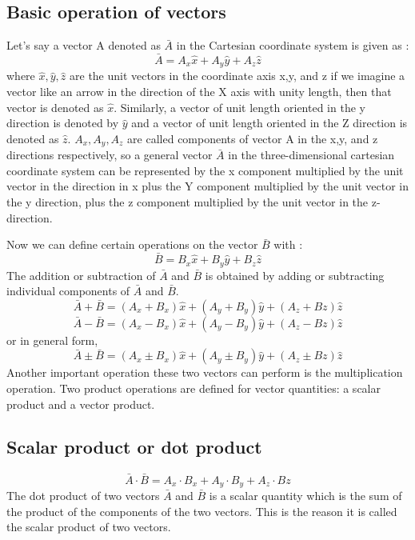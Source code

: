 \subsection{Basic operation of vectors}
Let's say a vector A denoted as $\bar{A}$ in the Cartesian coordinate system is given as :
\begin{equation}
\bar{A} = A_{x}\hat{x} + A_{y}\hat{y} + A_{z}\hat{z} 
\end{equation}
where $\hat{x},\hat{y},\hat{z}$ are the unit vectors in the coordinate axis x,y, and z if we imagine a vector like an arrow in the direction of the X axis with unity length, then that vector is denoted as $\hat{x}$. Similarly, a vector of unit length oriented in the y direction is denoted by $\hat{y}$ and a vector of unit length oriented in the Z direction is denoted as $\hat{z}$. $A_{x}, A_{y}, A_{z}$ are called components of vector A in the x,y, and z directions respectively, so a general vector $\bar{A}$ in the three-dimensional cartesian coordinate system can be represented by the x component multiplied by the unit vector in the direction in x plus the Y component multiplied by the unit vector in the y direction, plus the z component multiplied by the unit vector in the z-direction.

Now we can define certain operations on the vector $\bar{B}$ with : 
\begin{equation}
\bar{B} = B_{x}\hat{x} + B_{y}\hat{y} + B_{z}\hat{z} 
\end{equation} 
The addition or subtraction of $\bar{A}$ and $\bar{B}$ is obtained by adding or subtracting individual components of $\bar{A}$ and $\bar{B}$.
\begin{equation}
\bar{A} + \bar{B} = (A_{x} + B_{x} )\hat{x} + (A_{y} + B_{y})\hat{y} +(A_{z} + B{z})\hat{z} 
\end{equation}
\begin{equation}
\bar{A} - \bar{B} = (A_{x} - B_{x} )\hat{x} + (A_{y} - B_{y})\hat{y} +(A_{z} - B{z})\hat{z}
\end{equation}
or in general form,
\begin{equation}
\bar{A} \pm \bar{B} = (A_{x} \pm B_{x} )\hat{x} + (A_{y} \pm B_{y})\hat{y} +(A_{z} \pm B{z})\hat{z}
\end{equation}
Another important operation these two vectors can perform is the multiplication operation. Two product operations are defined for vector quantities: a scalar product and a vector product.

\subsection{Scalar product or dot product}
\begin{equation}
\bar{A}\cdot\bar{B} = A_{x}\cdot B_{x} + A_{y}\cdot B_{y} + A_{z}\cdot B{z} 
\end{equation}
The dot product of two vectors $\bar{A}$ and $\bar{B}$ is a scalar quantity which is the sum of the product of the components of the two vectors. This is the reason it is called the scalar product of two vectors.

